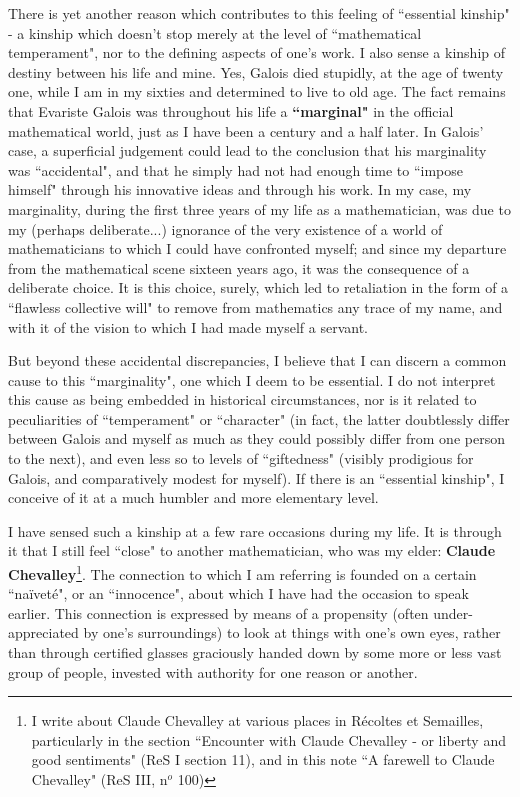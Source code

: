 There is yet another reason which contributes to this feeling of ``essential kinship" - a kinship which doesn't stop merely at the level of ``mathematical temperament", nor to the defining aspects of one's work. I also sense a kinship of destiny between his life and mine. Yes, Galois died stupidly, at the age of twenty one, while I am in my sixties and determined to live to old age. The fact remains that Evariste Galois was throughout his life a \textbf{``marginal"} in the official mathematical world, just as I have been a century and a half later. In Galois' case, a superficial judgement could lead to the conclusion that his marginality was ``accidental", and that he simply had not had enough time to ``impose himself" through his innovative ideas and through his work. In my case, my marginality, during the first three years of my life as a mathematician, was due to my (perhaps deliberate...) ignorance of the very existence of a world of mathematicians to which I could have confronted myself; and since my departure from the mathematical scene sixteen years ago, it was the consequence of a deliberate choice. It is this choice, surely, which led to retaliation in the form of a ``flawless collective will" to remove from mathematics any trace of my name, and with it of the vision to which I had made myself a servant. 

But beyond these accidental discrepancies, I believe that I can discern a common cause to this ``marginality", one which I deem to be essential. I do not interpret this cause as being embedded in historical circumstances, nor is it related to peculiarities of ``temperament" or ``character" (in fact, the latter doubtlessly differ between Galois and myself as much as they could possibly differ from one person to the next), and even less so to levels of ``giftedness" (visibly prodigious for Galois, and comparatively modest for myself). If there is an ``essential kinship", I conceive of it at a much humbler and more elementary level. 

I have sensed such a kinship at a few rare occasions during my life. It is through it that I still feel ``close" to another mathematician, who was my elder: \textbf{Claude Chevalley}\footnote{I write about Claude Chevalley at various places in R\'ecoltes et Semailles, particularly in the section ``Encounter with Claude Chevalley - or liberty and good sentiments" (ReS I section 11), and in this note ``A farewell to Claude Chevalley" (ReS III, n$^o$ 100)}.
The connection to which I am referring is founded on a certain ``na\"ivet\'e", or an ``innocence", about which I have had the occasion to speak earlier. This connection is expressed by means of a propensity (often under-appreciated by one's surroundings) to look at things with one's own eyes, rather than through certified glasses graciously handed down by some more or less vast group of people, invested with authority for one reason or another. 

